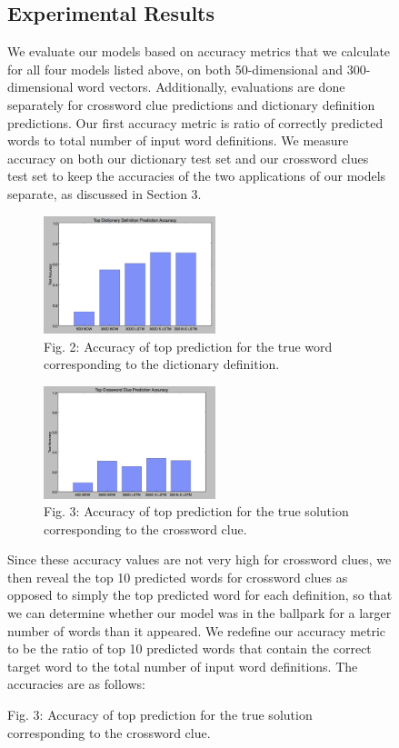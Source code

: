 \documentclass{article} %
\begin{document}
\begin{figure}
\subsection{Experimental Results}
We evaluate our models based on accuracy metrics that we calculate for all four models listed above, on both 50-dimensional and 300-dimensional word vectors. Additionally, evaluations are done separately for crossword clue predictions and dictionary definition predictions.
Our first accuracy metric is ratio of correctly predicted words to total number of input word definitions. We measure accuracy on both our dictionary test set and our crossword clues test set to keep the accuracies of the two applications of our models separate, as discussed in Section 3.

\begin{figure}
    \centering
	\includegraphics[width=50mm]{REAL_topdictdef.png}
	\caption{Fig. 2: Accuracy of top prediction for the true word corresponding to the dictionary definition.}
\end{figure}

\begin{figure}
    \centering
	\includegraphics[width=50mm]{REAL_topcrossclue.png}
	\caption{Fig. 3: Accuracy of top prediction for the true solution corresponding to the crossword clue.}
\end{figure}

Since these accuracy values are not very high for crossword clues, we then reveal the top 10 predicted words for crossword clues as opposed to simply the top predicted word for each definition, so that we can determine whether our model was in the ballpark for a larger number of words than it appeared. We redefine our accuracy metric to be the ratio of top 10 predicted words that contain the correct target word to the total number of input word definitions. The accuracies are as follows:


\end{figure}
\end{document}
